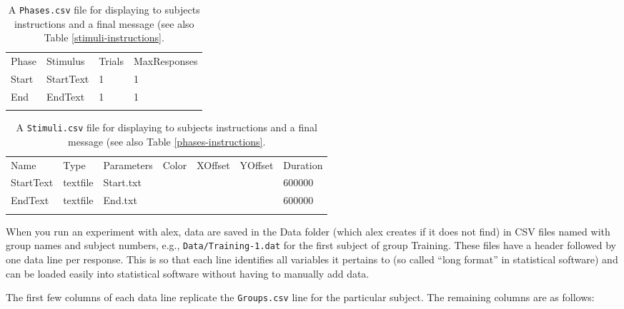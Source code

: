 \documentclass[11pt,]{article}
\renewcommand{\medskip}{}
\begin{document}
\begin{longtable}[c]{@{}llll@{}}
\hline\noalign{\medskip}
Phase & Stimulus & Trials & MaxResponses
\\\noalign{\medskip}
\hline\noalign{\medskip}
Start & StartText & 1 & 1
\\\noalign{\medskip}
End & EndText & 1 & 1
\\\noalign{\medskip}
\hline
\noalign{\medskip}
\caption{A \texttt{Phases.csv} file for displaying to subjects
instructions and a final message (see also Table
\ref{stimuli-instructions}.}
\end{longtable}

\begin{longtable}[c]{@{}lllllll@{}}
\hline\noalign{\medskip}
Name & Type & Parameters & Color & XOffset & YOffset & Duration
\\\noalign{\medskip}
\hline\noalign{\medskip}
StartText & textfile & Start.txt & & & & 600000
\\\noalign{\medskip}
EndText & textfile & End.txt & & & & 600000
\\\noalign{\medskip}
\hline
\noalign{\medskip}
\caption{A \texttt{Stimuli.csv} file for displaying to subjects
instructions and a final message (see also Table
\ref{phases-instructions}.}
\end{longtable}


When you run an experiment with alex, data are saved in the Data folder
(which alex creates if it does not find) in CSV files named with group
names and subject numbers, e.g., \texttt{Data/Training-1.dat} for the
first subject of group Training. These files have a header followed by
one data line per response. This is so that each line identifies all
variables it pertains to (so called ``long format'' in statistical
software) and can be loaded easily into statistical software without
having to manually add data.

The first few columns of each data line replicate the
\texttt{Groups.csv} line for the particular subject. The remaining
columns are as follows:
\end{document}
